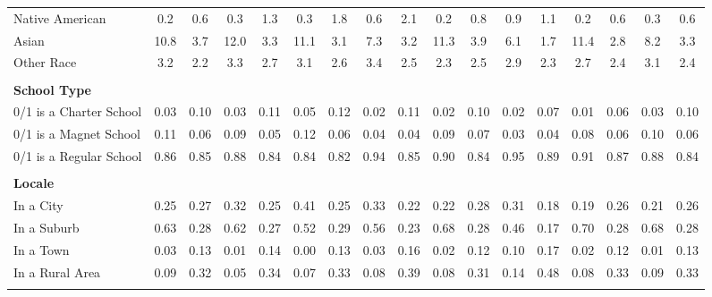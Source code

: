 \begin{tabular*}{\linewidth}{@{\extracolsep{\fill} } lcccccccccccccccc}
\hspace{0.2cm}Native American&0.2&0.6&0.3&1.3&0.3&1.8&0.6&2.1&0.2&0.8&0.9&1.1&0.2&0.6&0.3&0.6\\%
\hspace{0.2cm}Asian&10.8&3.7&12.0&3.3&11.1&3.1&7.3&3.2&11.3&3.9&6.1&1.7&11.4&2.8&8.2&3.3\\%
\hspace{0.2cm}Other Race&3.2&2.2&3.3&2.7&3.1&2.6&3.4&2.5&2.3&2.5&2.9&2.3&2.7&2.4&3.1&2.4\\%
&&&&&&&&&&&&&&&&\\%
\multicolumn{17}{l}{\bfseries School Type}\\%
\hspace{0.2cm}0/1 is a Charter School&0.03&0.10&0.03&0.11&0.05&0.12&0.02&0.11&0.02&0.10&0.02&0.07&0.01&0.06&0.03&0.10\\%
\hspace{0.2cm}0/1 is a Magnet School&0.11&0.06&0.09&0.05&0.12&0.06&0.04&0.04&0.09&0.07&0.03&0.04&0.08&0.06&0.10&0.06\\%
\hspace{0.2cm}0/1 is a Regular School&0.86&0.85&0.88&0.84&0.84&0.82&0.94&0.85&0.90&0.84&0.95&0.89&0.91&0.87&0.88&0.84\\%
&&&&&&&&&&&&&&&&\\%
\multicolumn{17}{l}{\bfseries Locale}\\%
\hspace{0.2cm}In a City&0.25&0.27&0.32&0.25&0.41&0.25&0.33&0.22&0.22&0.28&0.31&0.18&0.19&0.26&0.21&0.26\\%
\hspace{0.2cm}In a Suburb&0.63&0.28&0.62&0.27&0.52&0.29&0.56&0.23&0.68&0.28&0.46&0.17&0.70&0.28&0.68&0.28\\%
\hspace{0.2cm}In a Town&0.03&0.13&0.01&0.14&0.00&0.13&0.03&0.16&0.02&0.12&0.10&0.17&0.02&0.12&0.01&0.13\\%
\hspace{0.2cm}In a Rural Area&0.09&0.32&0.05&0.34&0.07&0.33&0.08&0.39&0.08&0.31&0.14&0.48&0.08&0.33&0.09&0.33\\%
&&&&&&&&&&&&&&&&\\%
\hline%
\end{tabular*}